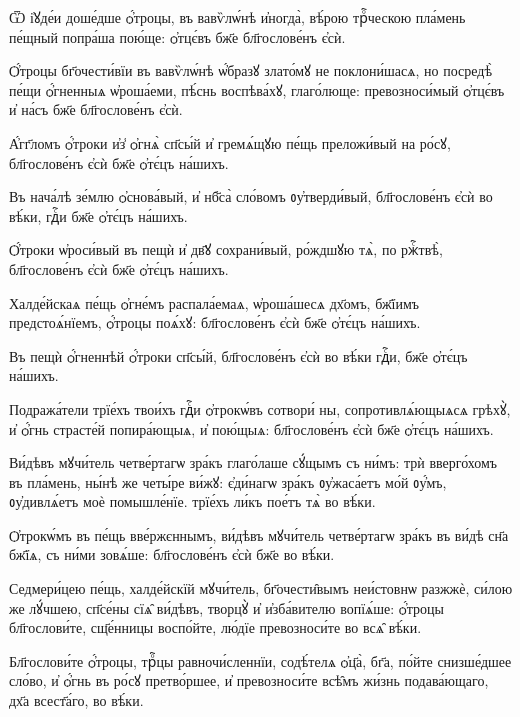 \hKv Ѿ і҆ꙋде́и доше́дше ѻ҆́троцы, въ вавѷлѡ́нѣ и҆ногда̀,  вѣ́рою трⷪ҇ческою пла́мень пе́щный попра́ша пою́ще:  ѻ҆тцє́въ бж҃е бл҃гослове́нъ є҆сѝ.  

\hKv Ѻ҆́троцы бг҃очести́вїи въ вавѷлѡ́нѣ ѡ҆́бразꙋ злато́мꙋ не  поклони́шасѧ, но посредѣ̀ пе́щи ѻ҆́гненныѧ ѡ҆роша́еми,  пѣ́снь воспѣва́хꙋ,  глаго́люще:  превозноси́мый ѻ҆тцє́въ и҆ на́съ бж҃е бл҃гослове́нъ  є҆сѝ. 

\hKv А҆́гг҃ломъ ѻ҆́троки и҆з̾ ѻ҆гнѧ̀ сп҃сы́й и҆ гремѧ́щꙋю  пе́щь преложи́вый на ро́сꙋ, бл҃гослове́нъ є҆сѝ бж҃е  ѻ҆тє́цъ на́шихъ. 

\hKv Въ нача́лѣ зе́млю ѻ҆снова́вый, и҆ нб҃са̀ сло́вомъ  ᲂу҆тверди́вый, бл҃гослове́нъ є҆сѝ во вѣ́ки, гдⷭ҇и бж҃е  ѻ҆тє́цъ на́шихъ. 

\hKv Ѻ҆́троки ѡ҆роси́вый въ пещѝ и҆ дв҃ꙋ сохрани́вый, ро́ждшꙋю  тѧ̀, по ржⷭ҇твѣ̀, бл҃гослове́нъ є҆сѝ бж҃е ѻ҆тє́цъ  на́шихъ. 
%

\hKv Халде́йскаѧ пе́щь  ѻ҆гне́мъ распала́емаѧ, ѡ҆роша́шесѧ дх҃омъ, бж҃їимъ  предстоѧ́нїемъ, ѻ҆́троцы поѧ́хꙋ: бл҃гослове́нъ є҆сѝ бж҃е  ѻ҆тє́цъ на́шихъ. 

\hKv Въ пещѝ ѻ҆́гненнѣй ѻ҆́троки сп҃сы́й, бл҃гослове́нъ  є҆сѝ во вѣ́ки гдⷭ҇и, бж҃е ѻ҆тє́цъ на́шихъ. 

\hKv Подража́тели трїе́хъ твои́хъ гдⷭ҇и ѻ҆трокѡ́въ сотвори́ ны,  сопротивлѧ́ющыѧсѧ грѣхꙋ̀, и҆   ѻ҆́гнь страсте́й попира́ющыѧ, и҆ пою́щыѧ: бл҃гослове́нъ  є҆сѝ бж҃е ѻ҆тє́цъ на́шихъ. 

\hKv Ви́дѣвъ мꙋчи́тель четве́ртагѡ зра́къ глаго́лаше сꙋ́щымъ съ  ни́мъ: трѝ вверго́хомъ въ пла́мень, ны́нѣ же четы́ре  ви́жꙋ: є҆ди́нагѡ зра́къ ᲂу҆жаса́етъ мо́й ᲂу҆́мъ,  ᲂу҆дивлѧ́етъ моѐ помышле́нїе. трїе́хъ ли́къ пое́тъ тѧ̀ во  вѣ́ки. 

\hKv Ѻ҆трокѡ́мъ въ пе́щь вве́ржєннымъ, ви́дѣвъ мꙋчи́тель  четве́ртагѡ зра́къ въ ви́дѣ сн҃а бж҃їѧ, съ ни́ми зовѧ́ше:  бл҃гослове́нъ є҆сѝ бж҃е во вѣ́ки. 
%

\hKv Седмери́цею пе́щь, халде́йскїй мꙋчи́тель, бг҃очести̑вымъ  неи́стовнѡ разжжѐ, си́лою же лꙋ́чшею, сп҃се́ны сїѧ̑  ви́дѣвъ, творцꙋ̀ и҆ и҆зба́вителю вопїѧ́ше: ѻ҆́троцы  бл҃гослови́те, сщ҃е́нницы воспо́йте, лю́дїе превозноси́те во  всѧ̑ вѣ́ки.  
%

\hKv Бл҃гослови́те ѻ҆́троцы, трⷪ҇цы  равночи́сленнїи, содѣ́телѧ ѻ҆ц҃а̀, бг҃а, по́йте  снизше́дшее сло́во, и҆ ѻ҆́гнь въ ро́сꙋ претво́ршее, и҆  превозноси́те всѣ̑мъ жи́знь подава́ющаго, дх҃а всест҃а́го,  во вѣ́ки. 
%

